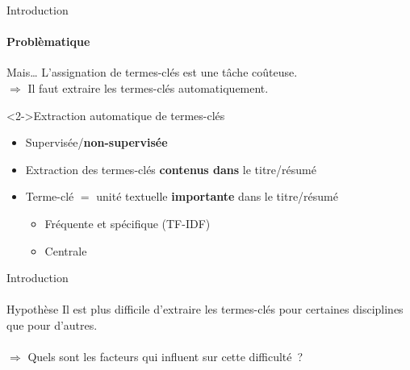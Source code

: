   \begin{frame}{Introduction}
    \framesubtitle{Problèmatique}

    \begin{alertblock}{Mais\dots}
        L'assignation de termes-clés est une tâche coûteuse.\\
        $\Rightarrow$ Il faut extraire les termes-clés automatiquement.
    \end{alertblock}

    \begin{block}<2->{Extraction automatique de termes-clés}
      \begin{itemize}
        \item{Supervisée/\textbf{non-supervisée}}
        \item{Extraction des termes-clés \textbf{contenus dans} le titre/résumé}
        \item{Terme-clé $=$ unité textuelle \textbf{importante} dans le
              titre/résumé}
          \begin{itemize}
            \item{Fréquente et spécifique (TF-IDF)}
            \item{Centrale~\cite[TextRank]{mihalcea2004textrank}}
          \end{itemize}
      \end{itemize}
    \end{block}
  \end{frame}

  \begin{frame}{Introduction}
    \framesubtitle{}

    \begin{block}{Hypothèse}
      Il est plus difficile d'extraire les termes-clés pour certaines disciplines
      que pour d'autres.\\~\\
      $\Rightarrow$ Quels sont les facteurs qui influent sur cette difficulté~?
    \end{block}
  \end{frame}

